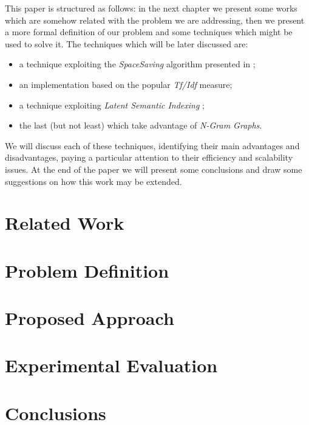 \documentclass{acm_proc_article-sp-sigmod07}
\begin{document}
This paper is structured as follows: in the next chapter we present some works
which are somehow related with the problem we are addressing, then we present a more
formal definition of our problem and some techniques which might be
used to solve it. The techniques which will be later discussed are:
\begin{itemize}
	\item a technique exploiting the \emph{SpaceSaving} algorithm presented in
		\cite{SS};
	\item an implementation based on the popular \emph{Tf/Idf} measure;
	\item a technique exploiting \emph{Latent Semantic Indexing} \cite{LSA};
	\item the last (but not least) which take advantage of \emph{N-Gram Graphs}.
		\cite{Ngram}
\end{itemize}
We will discuss each of these techniques, identifying their main advantages and disadvantages, paying a particular attention to their efficiency and scalability issues.
At the end of the paper we will present some conclusions and draw some suggestions on how this work may be extended.

\section{Related Work}


\section{Problem Definition}


\section{Proposed Approach}


\section{Experimental Evaluation}


\section{Conclusions}

\end{document}
